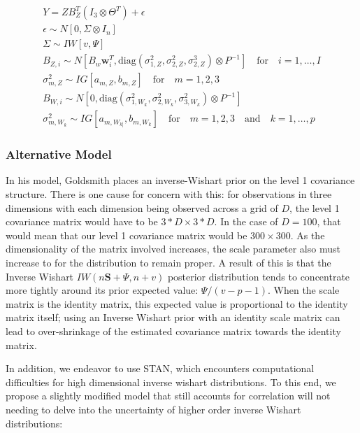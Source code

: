 \documentclass[AMA,Times1COL]{WileyNJDv5} %
\begin{document}
\begin{equation}
    \begin{split}
        Y = ZB_Z^T\left(I_3 \otimes\Theta^T\right) + \epsilon\\
        \epsilon\sim N[0, \Sigma\otimes I_n]\\
        \Sigma \sim IW[v, \Psi]\\
        B_{Z,i} \sim N[B_w \boldsymbol{w}_i^T, \text{diag}\left(\sigma_{1,Z}^2, \sigma_{2,Z}^2, \sigma_{2,Z}^3\right)\otimes P^{-1}]\quad \text{for} \quad i = 1,\dots, I\\
        \sigma_{m,Z}^2 \sim IG[a_{m,Z}, b_{m,Z}]\quad \text{for} \quad m = 1,2, 3\\
        B_{W,i} \sim N[0, \text{diag}\left(\sigma_{1,W_{k}}^2, \sigma_{2,W_{k}}^2, \sigma_{3,W_{k}}^2\right)\otimes P^{-1}]\\
        \sigma_{m,W_{k}}^2 \sim IG[a_{m,W_{k]}}, b_{m,W_{k}}]\quad \text{for} \quad m = 1,2, 3 \quad\text{and} \quad k = 1,\dots, p
    \end{split}
\end{equation}

\subsubsection{Alternative Model}
In his model, Goldsmith places an inverse-Wishart prior on the level 1 covariance structure.  There is one cause for concern with this: for observations in three dimensions with each dimension being observed across a grid of \(D\), the level 1 covariance matrix would have to be \(3*D\times 3*D\).  In the case of \(D=100\), that would mean that our level 1 covariance matrix would be \(300\times300\).  As the dimensionality of the matrix involved increases, the scale parameter also must increase to for the distribution to remain proper.  A result of this is that the Inverse Wishart \(IW\left(n\boldsymbol{S} + \Psi, n + v\right)\) posterior distribution tends to concentrate more tightly around its prior expected value: \(\Psi/{\left(v-p-1\right)}\)\cite{zhang_note_2021}. When the scale matrix is the identity matrix, this expected value is proportional to the identity matrix itself; using an Inverse Wishart prior with an identity scale matrix can lead to over-shrinkage of the estimated covariance matrix towards the identity matrix.

In addition, we endeavor to use STAN, which encounters computational difficulties for high dimensional inverse wishart distributions.  To this end, we propose a slightly modified model that still accounts for correlation will not needing to delve into the uncertainty of higher order inverse Wishart distributions: 
\end{document}

